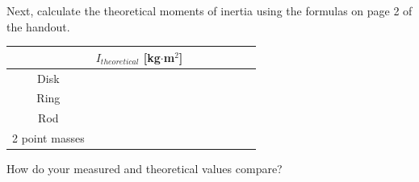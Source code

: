 \documentclass[11pt,letterpaper]{article}
\begin{document}
Next, calculate the theoretical moments of inertia using the formulas on page 2 of the handout.

\begin{table}[h!]
\begin{tabular}{|c|c|c|c|c|c|c|c|}
\hline
& $I_{theoretical}$ [kg$\cdot$m$^2$]\\
\hline Disk & \hspace{1.5cm}\\
\hline Ring & \\
\hline Rod & \\
\hline 2 point masses & \\
\hline
\end{tabular}
\end{table}

How do your measured and theoretical values compare?
\end{document}
